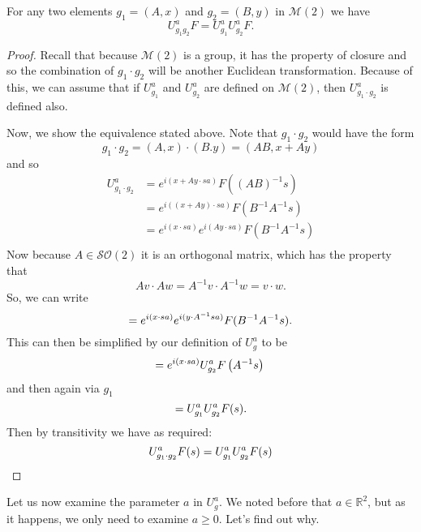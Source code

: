 \documentclass{article}
\begin{document}
\begin{theorem}
    For any two elements $g_1 = (A,x)$ and $g_2 = (B,y)$ in $\mathcal{M}(2)$ we have
    \[%
        U^{a}_{g_1 g_2} F =  U^{a}_{g_1} U^{a}_{g_2} F.
    \]%
\end{theorem}
\begin{proof}
    Recall that because $\mathcal{M}(2)$ is a group, it has the property of closure and so the combination of $g_1 \cdot g_2$ will be another Euclidean transformation. Because of this, we can assume that if $U^{a}_{g_1}$ and $U^{a}_{g_2}$ are defined on $\mathcal{M}(2)$, then $U^{a}_{g_1 \cdot g_2}$ is defined also.

    Now, we show the equivalence stated above. Note that $g_1 \cdot g_2$ would have the form
    \[%
        g_1 \cdot g_2 = (A,x)\cdot(B.y) = (AB, x+Ay) 
    \]%
    and so 
    \[%
        \begin{split}
        U^{a}_{g_1 \cdot g_2} 
        &= e^{i (x+Ay \cdot sa)}F((AB)^{-1} s) \\
        &= e^{i \left( (x+Ay) \cdot sa\right)}F(B^{-1}A^{-1} s) \\
        &= e^{i (x \cdot sa)} e^{i (Ay \cdot sa)} F(B^{-1}A^{-1} s) \\
        \end{split}
    \]%
    Now because $A \in \mathcal{SO}(2)$ it is an orthogonal matrix, which has the property that
    \[ Av \cdot Aw = A^{-1}v \cdot A^{-1}w = v \cdot w .\]
    So, we can write
    \[%
        =
        e^{i (x \cdot sa)} e^{i (y \cdot A^{-1}sa)} F(B^{-1}A^{-1} s) \\
    .\]%
    This can then be simplified by our definition of $U^{a}_{g}$ to be
    \[%
        =
        e^{i (x \cdot sa)} U^{a}_{g_2} F\left( A^{-1} s \right) \\
    \]%
    and then again via $g_1$
    \[%
        =
        U^{a}_{g_1} U^{a}_{g_2} F ( s ) \\
    .\]%
    Then by transitivity we have as required:
    \[%
        U^{a}_{g_1 \cdot g_2} F(s)
        =
        U^{a}_{g_1} U^{a}_{g_2} F ( s ) \\
    \]%
\end{proof}

Let us now examine the parameter $a$ in $U^{a}_{g}$. We noted before that $a \in \mathbb{R}^{2}$, but as it happens, we only need to examine $a \geq 0$. Let's find out why.
\end{document}
